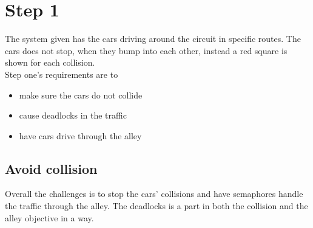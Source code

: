 \section{Step 1}
The system given has the cars driving around the circuit in specific routes. The cars does not stop, when they bump into each other, instead a red square is shown for each collision.
\\

Step one's requirements are to
\begin{itemize}
\item make sure the cars do not collide
\item cause deadlocks in the traffic
\item have cars drive through the alley
\end{itemize}

\subsection{Avoid collision}
Overall the challenges is to stop the cars' collisions and have semaphores handle the traffic through the alley. The deadlocks is a part in both the collision and the alley objective in a way.

